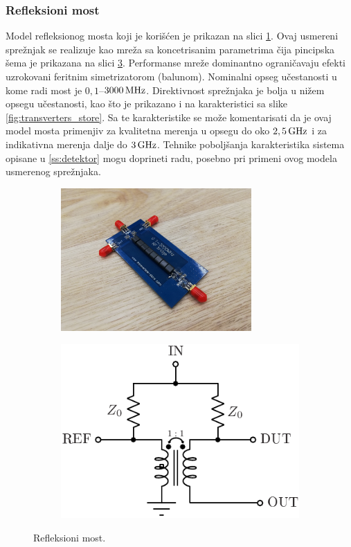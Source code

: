 \documentclass[a4paper, 12pt, diplomski]{etf}
\newcommand{\unit}[1]{\,{\rm #1}}
\begin{document}
\subsubsection{Refleksioni most}
Model refleksionog mosta koji je korišćen je prikazan na slici
\ref{fig:SWR_bridge}. Ovaj usmereni sprežnjak se
realizuje kao mreža sa koncetrisanim parametrima
čija pincipska šema je prikazana na slici
\ref{fig:SWR_bridge_princ}. Performanse 
mreže dominantno ograničavaju efekti uzrokovani
feritnim simetrizatorom (balunom). 
Nominalni opseg učestanosti
u kome radi most je $0,1$--$3000\unit{MHz}$. 
Direktivnost sprežnjaka je bolja u nižem opsegu
učestanosti, kao što je prikazano i na 
karakteristici sa slike
 \ref{fig:transverters_store}. Sa te karakteristike 
 se može
 komentarisati da je ovaj model mosta primenjiv za 
 kvalitetna merenja u opsegu do oko $2,5\unit{GHz}$ i 
 za indikativna merenja dalje do $3\unit{GHz}$.
 Tehnike poboljšanja karakteristika 
 sistema opisane u \ref{ss:detektor} 
 mogu doprineti radu, posebno pri 
 primeni ovog modela usmerenog sprežnjaka.
%
\begin{figure}[ht!]
    \begin{subfigure}[b]{0.45\textwidth}
        \centering
        \includegraphics[width=0.8\textwidth]
        {fig/swr.jpg}
        \label{fig:SWR_bridge}
    \end{subfigure}
    \begin{subfigure}[b]{0.45\textwidth}
        \centering
        \includegraphics[scale=0.9]{fig/swr_bridge.pdf}
        \label{fig:SWR_bridge_princ}
    \end{subfigure}
    \caption{Refleksioni most.}
\end{figure}
\end{document}

